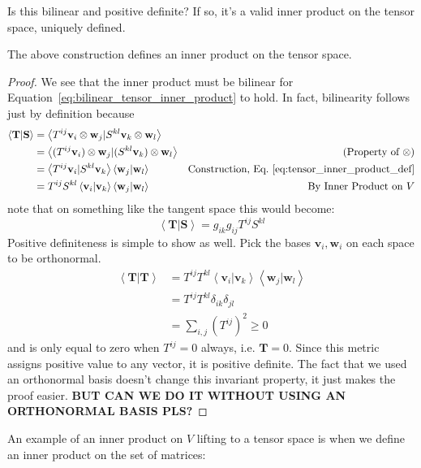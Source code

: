 	Is this bilinear and positive definite? If so, it's a valid inner product on the tensor space, uniquely defined.
	\begin{prop}
		The above construction defines an inner product on the tensor space.
	\end{prop} 
	\begin{proof}
		We see that the inner product must be bilinear for Equation~\eqref{eq:bilinear_tensor_inner_product} to hold. In fact, bilinearity follows just by definition because
		\begin{align*}
			\left< \mathbf{T} | \mathbf{S} \right> 
			&= \left< T^{ij} \mathbf v_i \otimes \mathbf w_j | S^{kl} \mathbf v_k \otimes \mathbf w_l \right> & \\
			&= \left< (T^{ij} \mathbf v_i) \otimes \mathbf w_j | (S^{kl} \mathbf v_k) \otimes \mathbf w_l \right>  & \text{(Property of $\otimes$)}\\
			& =\left< T^{ij} \mathbf v_i | S^{kl} \mathbf v_k \right> \left< \mathbf w_j | \mathbf w_l \right> & \text{Construction, Eq.~\eqref{eq:tensor_inner_product_def}}\\
			& = T^{ij} S^{kl} \left< \mathbf v_i | \mathbf v_k \right> \left< \mathbf w_j | \mathbf w_l \right> & \text{By Inner Product on $V$}
		\end{align*}
		note that on something like the tangent space this would become:
		\begin{equation}
			\left< \mathbf{T} | \mathbf{S} \right> = g_{ik} g_{ij} T^{ij} S^{kl}
		\end{equation}
		Positive definiteness is simple to show as well. Pick the bases $\mathbf v_i, \mathbf w_i$ on each space to be orthonormal. 
		\begin{align*}
			\left< \mathbf{T} | \mathbf{T} \right> 
			&= T^{ij} T^{kl} \left< \mathbf v_i | \mathbf v_k \right> \left< \mathbf w_j | \mathbf w_l \right> \\
			&= T^{ij} T^{kl} \delta_{ik} \delta_{jl} \\
			&= \sum_{i, j} (T^{ij})^2 \geq 0
		\end{align*}
		and is only equal to zero when $T^{ij}=0$ always, i.e. $\mathbf T = 0$. Since this metric assigns positive value to any vector, it is positive definite. The fact that we used an orthonormal basis doesn't change this invariant property, it just makes the proof easier. 
		\textbf{BUT CAN WE DO IT WITHOUT USING AN ORTHONORMAL BASIS PLS?}
	\end{proof}
	An example of an inner product on $V$ lifting to a tensor space is when we define an inner product on the set of matrices:
